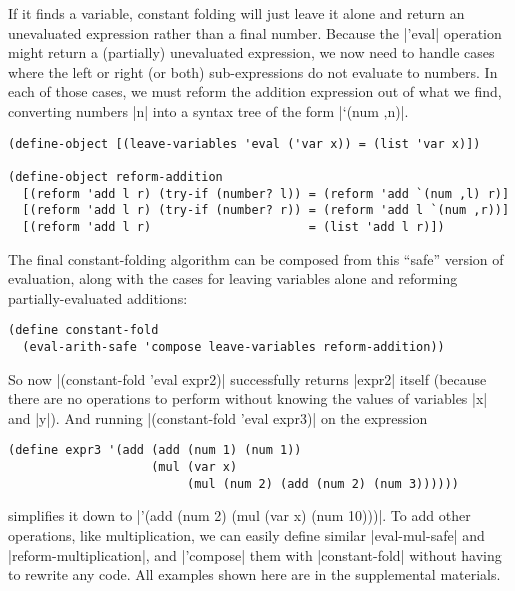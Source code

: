 If it finds a variable, constant folding will just leave it alone and return an unevaluated expression rather than a final number.
Because the \scm|'eval| operation might return a (partially) unevaluated expression, we now need to handle cases where the left or right (or both) sub-expressions do not evaluate to numbers.
In each of those cases, we must reform the addition expression out of what we find, converting numbers \scm|n| into a syntax tree of the form \scm|`(num ,n)|.
\begin{verbatim}
(define-object [(leave-variables 'eval ('var x)) = (list 'var x)])

(define-object reform-addition
  [(reform 'add l r) (try-if (number? l)) = (reform 'add `(num ,l) r)]
  [(reform 'add l r) (try-if (number? r)) = (reform 'add l `(num ,r))]
  [(reform 'add l r)                      = (list 'add l r)])
\end{verbatim}
The final constant-folding algorithm can be composed from this ``safe'' version of evaluation, along with the cases for leaving variables alone and reforming partially-evaluated additions:
\begin{verbatim}
(define constant-fold
  (eval-arith-safe 'compose leave-variables reform-addition))
\end{verbatim}
So now \scm|(constant-fold 'eval expr2)| successfully returns \scm|expr2| itself (because there are no operations to perform without knowing the values of variables \scm|x| and \scm|y|).
And running \scm|(constant-fold 'eval expr3)| on the expression
\begin{verbatim}
(define expr3 '(add (add (num 1) (num 1))
                    (mul (var x)
                         (mul (num 2) (add (num 2) (num 3))))))
\end{verbatim}
simplifies it down to \scm|'(add (num 2) (mul (var x) (num 10)))|.
To add other operations, like multiplication, we can easily define similar \scm|eval-mul-safe| and \scm|reform-multiplication|, and \scm|'compose| them with \scm|constant-fold| without having to rewrite any code.
All examples shown here are in the supplemental materials.

